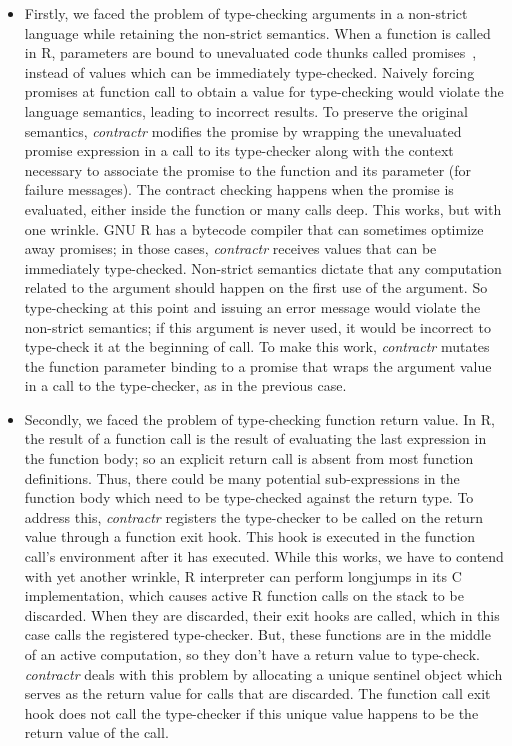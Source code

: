 \documentclass[acmsmall,review,anonymous]{acmart}\settopmatter{printfolios=true,printccs=false,printacmref=false}
\newcommand{\contractr}{\emph{contractr}\xspace} %
\begin{document}
\begin{itemize}
\item Firstly, we faced the problem of type-checking arguments in a non-strict
  language while retaining the non-strict semantics. When a function is called in
  R, parameters are bound to unevaluated code thunks called
  promises~\cite{oopsla19}, instead of values which can be immediately
  type-checked. Naively forcing promises at function call to obtain a value for
  type-checking would violate the language semantics, leading to incorrect
  results. To preserve the original semantics, \contractr modifies the
  promise by wrapping the unevaluated promise expression in a call to its
  type-checker along with the context necessary to associate the promise to the
  function and its parameter (for failure messages). The contract checking happens
  when the promise is evaluated, either inside the function or many calls deep.
  This works, but with one wrinkle. GNU R has a bytecode compiler that can
  sometimes optimize away promises; in those cases, \contractr receives
  values that can be immediately type-checked. Non-strict semantics dictate that
  any computation related to the argument should happen on the first use of the
  argument. So type-checking at this point and issuing an error message would
  violate the non-strict semantics; if this argument is never used, it would be
  incorrect to type-check it at the beginning of call. To make this work,
  \contractr mutates the function parameter binding to a promise that wraps
  the argument value in a call to the type-checker, as in the previous case.
\item Secondly, we faced the problem of type-checking function return value. In R, the
  result of a function call is the result of evaluating the last expression in the
  function body; so an explicit return call is absent from most function
  definitions. Thus, there could be many potential sub-expressions in the function
  body which need to be type-checked against the return type. To address this,
  \contractr registers the type-checker to be called on the return value
  through a function exit hook. This hook is executed in the function call's
  environment after it has executed. While this works, we have to contend with yet
  another wrinkle, R interpreter can perform longjumps in its C implementation,
  which causes active R function calls on the stack to be discarded. When they are
  discarded, their exit hooks are called, which in this case calls the registered
  type-checker. But, these functions are in the middle of an active computation,
  so they don't have a return value to type-check. \contractr deals with
  this problem by allocating a unique sentinel object which serves as the return
  value for calls that are discarded. The function call exit hook does not call
  the type-checker if this unique value happens to be the return value of the
  call.
\end{itemize}
%
%
\end{document}

